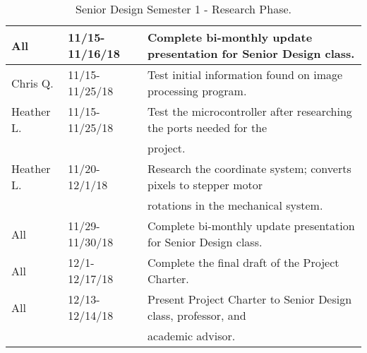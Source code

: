 \begin{table} [H]
\begin{tabular}{|l|l|l|}
		All & 11/15-11/16/18 & Complete bi-monthly update presentation for Senior Design class.\\
		\hline
		Chris Q. & 11/15-11/25/18 & Test initial information found on image processing program.\\
		\hline
		Heather L. & 11/15-11/25/18 & Test the microcontroller after researching the ports needed for the \\
		& & project.\\
		\hline
		Heather L. & 11/20-12/1/18 & Research the coordinate system; converts pixels to stepper motor \\
		& & rotations in the mechanical system.\\
		\hline
		All & 11/29-11/30/18 & 
		Complete bi-monthly update presentation for Senior Design class.\\
		\hline
		All & 12/1-12/17/18 & 
		Complete the final draft of the Project Charter.\\
		\hline
		All & 12/13-12/14/18 & 
		Present Project Charter to Senior Design class, professor, and \\
		& & academic advisor.\\
		\hline
	\end{tabular} 
	\caption{Senior Design Semester 1 - Research Phase.}
	\label{table:2}
\end{table}	

